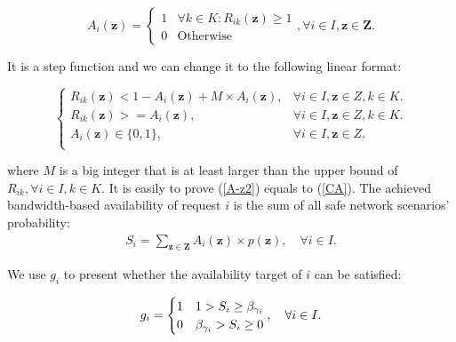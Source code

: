 \documentclass[sigconf]{acmart}
\begin{document}
\begin{appendices}
\begin{equation}
A_i(\bm{z})=
\begin{cases}
1 &\text{$\forall k \in K:R_{ik}(\bm{z})\ge 1$}\\
0&\text{Otherwise}
\end{cases}
,\forall  i \in I, \bm{z}\in \bm{Z}.
\label{CA}
\end{equation}



It is a step function and we can change it to the following linear format:
%
 


\begin{equation}
\begin{cases}
R_{ik}(\bm{z}) < 1- A_i(\bm{z})+M\times A_i(\bm{z}),&{\forall i \in I, \bm{z} \in Z, k\in K.} \\
R_{ik}(\bm{z})>=A_i(\bm{z}),&{\forall i \in I, \bm{z} \in Z, k\in K.} \\
A_i(\bm{z}) \in\{0,1\},&{\forall i \in I, \bm{z} \in Z.} \\
\end{cases}
\label{A-z2}
\end{equation}

where $M$ is a big integer that is at least larger than the upper bound of $R_{ik},\forall i \in I,k\in K$.
It is easily to  prove  (\ref{A-z2}) equals to  (\ref{CA}).
The achieved bandwidth-based availability of request $i$ is the sum of all safe network scenarios' probability: 
 \begin{eqnarray} \label{S}
S_i=\sum_{\bm{z}\in \bm{Z}}A_i(\bm{z})\times p(\bm{z}),  \quad \forall  i \in I.
\end{eqnarray}

We use $g_i$ to present whether the availability target of $i$ can be satisfied: 

\begin{equation}
 g_i=
\begin{cases}
1 &\text{$1 >S_i \ge \beta_{\gamma_{i}}$}\\
0 &\text{$ \beta_{\gamma_{i}} >S_i \ge 0 $}
\end{cases},
\ \ \ \forall  i \in I.
\label{availability4}
\end{equation}


\end{appendices}
\end{document}
